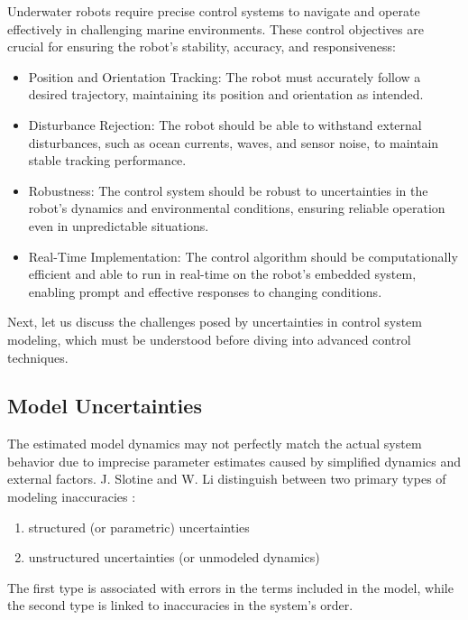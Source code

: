     Underwater robots require precise control systems to navigate and operate effectively
    in challenging marine environments. These control objectives are crucial for ensuring
    the robot's stability, accuracy, and responsiveness:
    \begin{itemize}
        \item Position and Orientation Tracking:
            The robot must accurately follow a desired trajectory, maintaining its position
            and orientation as intended.
        \item Disturbance Rejection:
            The robot should be able to withstand external disturbances, such as ocean
            currents, waves, and sensor noise, to maintain stable tracking performance.
        \item Robustness:
            The control system should be robust to uncertainties in the robot's dynamics
            and environmental conditions, ensuring reliable operation even in unpredictable
            situations.
        \item Real-Time Implementation:
            The control algorithm should be computationally efficient and able to run in
            real-time on the robot's embedded system, enabling prompt and effective
            responses to changing conditions.
    \end{itemize}

    Next, let us discuss the challenges posed by uncertainties in control system modeling, 
    which must be understood before diving into advanced control techniques.

\subsection{Model Uncertainties}

    The estimated model dynamics may not perfectly match the actual system behavior 
    due to imprecise parameter estimates caused by simplified dynamics 
    and external factors. J. Slotine and W. Li distinguish between two primary 
    types of modeling inaccuracies \cite{slotine_applied}:
    \begin{enumerate}
        \item structured (or parametric) uncertainties
        \item unstructured uncertainties (or unmodeled dynamics)
    \end{enumerate}
    The first type is associated with errors in the terms included in the model, 
    while the second type is linked to inaccuracies in the system's order.

